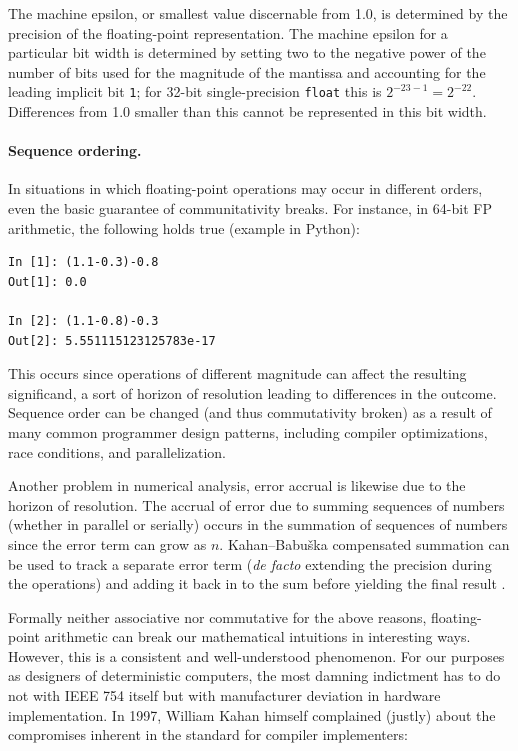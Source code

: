\documentclass[twoside]{article}
\begin{document}
The machine epsilon, or smallest value discernable from 1.0, is determined by the precision of the floating-point representation.  The machine epsilon for a particular bit width is determined by setting two to the negative power of the number of bits used for the magnitude of the mantissa and accounting for the leading implicit bit \texttt{1}; for 32-bit single-precision \texttt{float} this is $2^{-{23-1}} = 2^{-22}$.  Differences from 1.0 smaller than this cannot be represented in this bit width.

\paragraph{Sequence ordering.}

In situations in which floating-point operations may occur in different orders, even the basic guarantee of communitativity breaks.  For instance, in 64-bit FP arithmetic, the following holds true (example in Python):

\lstset{language=Python}
\begin{lstlisting}
In [1]: (1.1-0.3)-0.8
Out[1]: 0.0

In [2]: (1.1-0.8)-0.3
Out[2]: 5.551115123125783e-17
\end{lstlisting}

\noindent
This occurs since operations of different magnitude can affect the resulting significand, a sort of horizon of resolution leading to differences in the outcome.  Sequence order can be changed (and thus commutativity broken) as a result of many common programmer design patterns, including compiler optimizations, race conditions, and parallelization.

Another problem in numerical analysis, error accrual is likewise due to the horizon of resolution.  The accrual of error due to summing sequences of numbers (whether in parallel or serially) occurs in the summation of sequences of numbers since the error term can grow as $n$.  Kahan–Babuška compensated summation can be used to track a separate error term (\emph{de facto} extending the precision during the operations) and adding it back in to the sum before yielding the final result \citep{Kahan1965,Babuska1969}.

Formally neither associative nor commutative for the above reasons, floating-point arithmetic can break our mathematical intuitions in interesting ways.  However, this is a consistent and well-understood phenomenon.  For our purposes as designers of deterministic computers, the most damning indictment has to do not with IEEE 754 itself but with manufacturer deviation in hardware implementation.  In 1997, William Kahan himself complained (justly) about the compromises inherent in the standard for compiler implementers:
\end{document}
